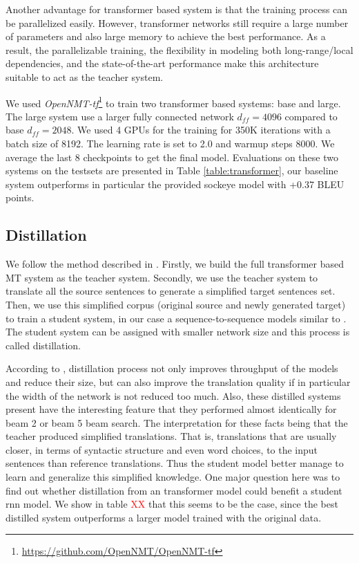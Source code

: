\documentclass[11pt,a4paper]{article}
\begin{document}
Another advantage for transformer based system is that the training process can be parallelized easily.
However, transformer networks still require a large number of parameters and also large memory to achieve the best performance.
As a result, the parallelizable training, the flexibility in modeling both long-range/local
dependencies, and the state-of-the-art performance make this architecture suitable to act as the teacher system.

We used \textit{OpenNMT-tf}\footnote{\url{https://github.com/OpenNMT/OpenNMT-tf}} to train two transformer based systems: base and large.
The large system  use a larger fully connected network $d_{ff}=4096$ compared to base $d_{ff}=2048$.
We used 4 GPUs for the training for 350K iterations with a batch size of 8192.
The learning rate is set to 2.0 and warmup steps 8000.
We average the last 8 checkpoints to get the final model.
Evaluations on these two systems on the testsets are presented in Table \ref{table:transformer}, our baseline system outperforms in particular the provided sockeye model with +0.37 BLEU points.


\subsection{Distillation}
\label{distill}

We follow the method described in . Firstly, we build the full transformer based MT system \cite{vaswani2017attention} as the teacher system. Secondly, we use the teacher system to translate all the source sentences to generate a simplified target sentences set.
Then, we use this simplified corpus (original source and newly generated target) to train a student system, in our case a sequence-to-sequence models similar to .
The student system can be assigned with smaller network size and this process is called distillation.

According to , distillation process not only improves throughput of the models and reduce their size, but can also improve the translation quality if in particular the width of the network is not reduced too much. Also, these distilled systems present have the interesting feature that they performed almost identically for beam 2 or beam 5 beam search. The interpretation for these facts being that the teacher produced simplified translations. That is, translations that are usually closer, in terms of syntactic structure and even word choices, to the input sentences than reference translations. Thus the student model better manage to learn and generalize this simplified knowledge. One major question here was to find out whether distillation from an transformer model could benefit a student rnn model. We show in table  \textcolor{red}{XX} that this seems to be the case, since the best distilled system outperforms a larger model trained with the original data.
\end{document}
